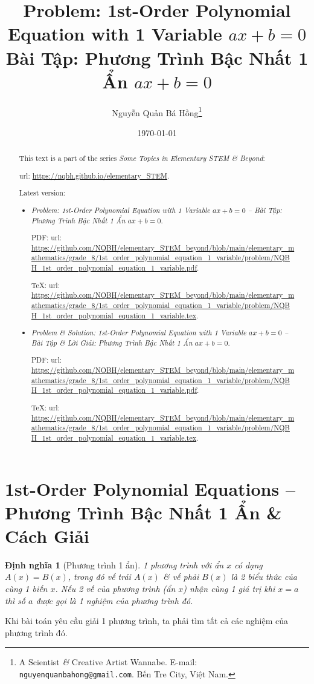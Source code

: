 \documentclass{article}
\title{Problem: 1st-Order Polynomial Equation with 1 Variable $ax + b = 0$\\Bài Tập: Phương Trình Bậc Nhất 1 Ẩn $ax + b = 0$}
\author{Nguyễn Quản Bá Hồng\footnote{A Scientist {\it\&} Creative Artist Wannabe. E-mail: {\tt nguyenquanbahong@gmail.com}. Bến Tre City, Việt Nam.}}
\date{\today}
\newtheorem{dinhnghia}{Định nghĩa}
\begin{document}
\maketitle
\begin{abstract}
	This text is a part of the series {\it Some Topics in Elementary STEM \& Beyond}:
	
	{\sc url}: \url{https://nqbh.github.io/elementary_STEM}.
	
	Latest version:
	\begin{itemize}
		\item {\it Problem: 1st-Order Polynomial Equation with 1 Variable $ax + b = 0$ -- Bài Tập: Phương Trình Bậc Nhất 1 Ẩn $ax + b = 0$}.
		
		PDF: {\sc url}: \url{https://github.com/NQBH/elementary_STEM_beyond/blob/main/elementary_mathematics/grade_8/1st_order_polynomial_equation_1_variable/problem/NQBH_1st_order_polynomial_equation_1_variable.pdf}.
		
		\TeX: {\sc url}: \url{https://github.com/NQBH/elementary_STEM_beyond/blob/main/elementary_mathematics/grade_8/1st_order_polynomial_equation_1_variable/problem/NQBH_1st_order_polynomial_equation_1_variable.tex}.
		\item {\it Problem \& Solution: 1st-Order Polynomial Equation with 1 Variable $ax + b = 0$ -- Bài Tập \& Lời Giải: Phương Trình Bậc Nhất 1 Ẩn $ax + b = 0$}.
		
		PDF: {\sc url}: \url{https://github.com/NQBH/elementary_STEM_beyond/blob/main/elementary_mathematics/grade_8/1st_order_polynomial_equation_1_variable/problem/NQBH_1st_order_polynomial_equation_1_variable.pdf}.
		
		\TeX: {\sc url}: \url{https://github.com/NQBH/elementary_STEM_beyond/blob/main/elementary_mathematics/grade_8/1st_order_polynomial_equation_1_variable/problem/NQBH_1st_order_polynomial_equation_1_variable.tex}.
	\end{itemize}
\end{abstract}
\tableofcontents
\newpage


\section{1st-Order Polynomial Equations -- Phương Trình Bậc Nhất 1 Ẩn \& Cách Giải}

\begin{dinhnghia}[Phương trình 1 ẩn]
	1 phương trình với ẩn $x$ có dạng $A(x) = B(x)$, trong đó \emph{vế trái} $A(x)$ \& \emph{vế phải} $B(x)$ là 2 biểu thức của cùng 1 biến $x$. Nếu 2 vế của phương trình (ẩn $x$) nhận cùng 1 giá trị khi $x = a$ thì số $a$ được gọi là 1 \emph{nghiệm} của phương trình đó.
\end{dinhnghia}
Khi bài toán yêu cầu giải 1 phương trình, ta phải tìm tất cả các nghiệm của phương trình đó.
\end{document}

